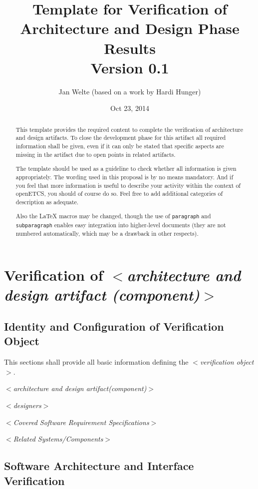\documentclass{article}
\title{Template for Verification of Architecture and Design Phase Results\\Version 0.1}
\author{Jan Welte (based on a work by Hardi Hunger)}
\date{Oct 23, 2014}
\newcommand{\tbi}[1]{$<$\textit{#1}$>$}
\begin{document}
\maketitle

\begin{abstract}
This template provides the required content to complete the verification of architecture and design artifacts.
To close the development phase for this artifact all required information shall be given, even if it can only be stated that specific aspects are missing in the artifact due to open points in related artifacts. 

The template should be used as a guideline to check whether all
information is given appropriately. The wording used in this proposal
is by no means mandatory. And if you feel that more information is
useful to describe your activity within the context of openETCS, you
should of course do so. Feel free to add additional categories of
description as adequate. 

Also the \LaTeX{} macros may be changed, though the use of
\texttt{paragraph} and \texttt{subparagraph} enables easy integration
into higher-level documents (they are not numbered automatically,
which may be a drawback in other respects). 
\end{abstract}

\section{Verification of \tbi{architecture and design artifact (component)}}

\subsection{Identity and Configuration of Verification Object}

This sections shall provide all basic information defining the \tbi{verification object}.

\tbi{architecture and design artifact(component)}

\tbi{designers}

\tbi{Covered Software Requirement Specifications}

\tbi{Related Systems/Components}


\subsection{Software Architecture and Interface Verification}
\end{document}
